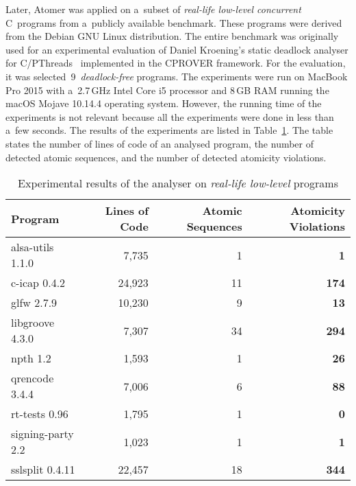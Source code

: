 Later, Atomer was applied on a~subset of \emph{real-life low-level
concurrent} C~programs from a~publicly available benchmark.
These programs were derived from the Debian GNU Linux distribution. The
entire benchmark was originally used for an experimental evaluation of
Daniel Kroening's static deadlock analyser for
C/PThreads~\cite{deadlockKroening} implemented in the CPROVER framework. For
the evaluation, it was selected~9~\emph{deadlock-free} programs. The experiments
were run on MacBook Pro 2015 with a~2.7\,GHz Intel Core i5 processor
and 8\,GB RAM running the macOS Mojave 10.14.4 operating system.
However, the running time of the experiments is not relevant because all
the experiments were done in less than a~few seconds. The results of the
experiments are listed in Table~\ref{tab:exp}. The table states the 
number of lines of code of an analysed program, the number of detected 
atomic sequences, and the number of detected atomicity violations.

\begin{table}[hbt]
    \centering

    \begin{tabular}{|l||r|r|r|}
        \hline
        Program & Lines of Code & Atomic Sequences
            & \textbf{Atomicity Violations} \\ \hline \hline

        alsa-utils 1.1.0 & 7,735 & 1 & \textbf{1} \\ \hline
        c-icap 0.4.2 & 24,923 & 11 & \textbf{174} \\ \hline
        glfw 2.7.9 & 10,230 & 9 & \textbf{13} \\ \hline
        libgroove 4.3.0 & 7,307 & 34 & \textbf{294} \\ \hline
        npth 1.2 & 1,593 & 1 & \textbf{26} \\ \hline
        qrencode 3.4.4 & 7,006 & 6 & \textbf{88} \\ \hline
        rt-tests 0.96 & 1,795 & 1 & \textbf{0} \\ \hline
        signing-party 2.2 & 1,023 & 1 & \textbf{1} \\ \hline
        sslsplit 0.4.11 & 22,457 & 18 & \textbf{344} \\ \hline
    \end{tabular}

    \caption{%
        Experimental results of the analyser on \emph{real-life
        low-level} programs
    }
    \label{tab:exp}
\end{table}


